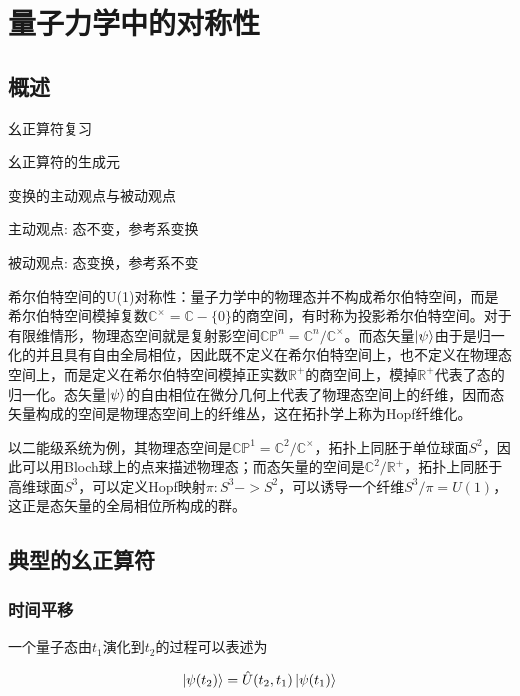 \section{量子力学中的对称性}

\subsection{概述}

幺正算符复习





幺正算符的生成元






变换的主动观点与被动观点

主动观点: 态不变，参考系变换

被动观点: 态变换，参考系不变

希尔伯特空间的U(1)对称性：量子力学中的物理态并不构成希尔伯特空间，而是希尔伯特空间模掉复数$\mathbb{C}^×=\mathbb{C}-\{0\}$的商空间，有时称为投影希尔伯特空间。对于有限维情形，物理态空间就是复射影空间$\mathbb{CP}^n=\mathbb{C}^n/\mathbb{C}^×$。而态矢量$\ket{\psi}$由于是归一化的并且具有自由全局相位，因此既不定义在希尔伯特空间上，也不定义在物理态空间上，而是定义在希尔伯特空间模掉正实数$\mathbb{R}^+$的商空间上，模掉$\mathbb{R}^+$代表了态的归一化。态矢量$\ket{\psi}$的自由相位在微分几何上代表了物理态空间上的纤维，因而态矢量构成的空间是物理态空间上的纤维丛，这在拓扑学上称为Hopf纤维化。

以二能级系统为例，其物理态空间是$\mathbb{CP}^1=\mathbb{C}^2/\mathbb{C}^×$，拓扑上同胚于单位球面$S^2$，因此可以用Bloch球上的点来描述物理态；而态矢量的空间是$\mathbb{C}^2/\mathbb{R}^+$，拓扑上同胚于高维球面$S^3$，可以定义Hopf映射$\pi:S^3->S^2$，可以诱导一个纤维$S^3/\pi=U(1)$，这正是态矢量的全局相位所构成的群。


\subsection{典型的幺正算符}

\subsubsection{时间平移}

一个量子态由$t_1$演化到$t_2$的过程可以表述为

\begin{equation}
    \ket{\psi(t_2)}=\hat{U}(t_2,t_1)\ket{\psi(t_1)}
\end{equation}

